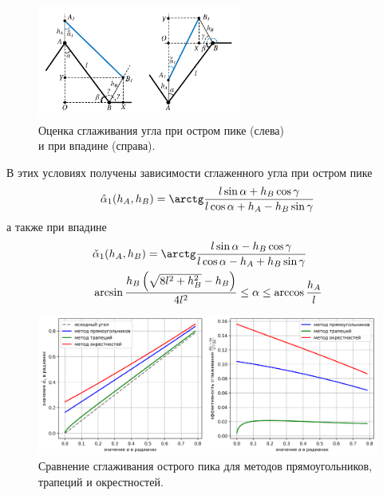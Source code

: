 \documentclass[a4paper,14pt]{extarticle}                     %
\theoremstyle{plain}                                         %
\begin{document}
\begin{figure}[ht]
\centering
\includegraphics[width=0.6\textwidth]{./pics/text_1_remesh_2d/peak-cavern-general.pdf}
\singlespacing
{}\caption{Оценка сглаживания угла при остром пике (слева) \\ и при впадине (справа).}
\label{fig:text_1_remesh_2d_peak_cavern_general}
\end{figure}

В этих условиях получены зависимости сглаженного угла при остром пике
\begin{equation}
\hat{\alpha}_1(h_A, h_B) = \arctg \frac{l \sin \alpha + h_B \cos \gamma}{l \cos \alpha + h_A - h_B \sin \gamma}
\end{equation}
а также при впадине 
\begin{equation}
	\begin{aligned}
		& \check{\alpha}_1(h_A, h_B) = \arctg \frac{l \sin \alpha - h_B \cos \gamma}{l \cos \alpha - h_A + h_B \sin \gamma} \\
		& \arcsin \frac{h_B \left( \sqrt{8 l^2 + h_B^2} - h_B \right)}{4 l^2} \le \alpha \le \arccos \frac{h_A}{l}
	\end{aligned}
\end{equation}

\begin{figure}[ht]
\centering
\includegraphics[width=1.0\textwidth]{./pics/text_1_remesh_2d/peak-methods-chart.png}
\singlespacing
{}\caption{Сравнение сглаживания острого пика для методов прямоугольников, трапеций и окрестностей.}
\label{fig:text_1_remesh_2d_peak_methods_chart}
\end{figure}
\end{document}

